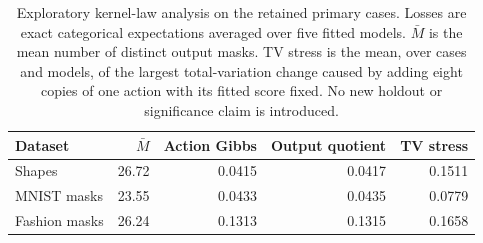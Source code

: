 \begin{table}[htbp]
\centering\small
\caption{Exploratory kernel-law analysis on the retained primary cases. Losses are exact categorical expectations averaged over five fitted models. $\bar M$ is the mean number of distinct output masks. TV stress is the mean, over cases and models, of the largest total-variation change caused by adding eight copies of one action with its fitted score fixed. No new holdout or significance claim is introduced.}\label{tab:quotient}
\begin{tabular}{lrrrr}\toprule
Dataset & $\bar M$ & Action Gibbs & Output quotient & TV stress\\\midrule
Shapes & 26.72 & 0.0415 & 0.0417 & 0.1511 \\
MNIST masks & 23.55 & 0.0433 & 0.0435 & 0.0779 \\
Fashion masks & 26.24 & 0.1313 & 0.1315 & 0.1658 \\
\bottomrule\end{tabular}
\end{table}
